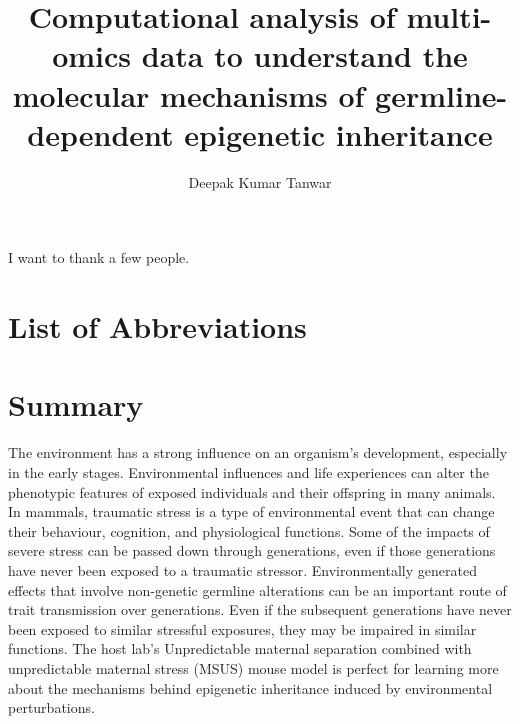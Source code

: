 \documentclass[12pt,twoside]{reedthesis}
\title{Computational analysis of multi-omics data to understand the molecular mechanisms of germline-dependent epigenetic inheritance}
\author{Deepak Kumar Tanwar}
\date{}
\begin{document}
  \maketitle

\frontmatter %
\pagestyle{empty} %
  \begin{acknowledgements}
    I want to thank a few people.
  \end{acknowledgements}

  \hypersetup{linkcolor=black}
  \setcounter{secnumdepth}{4}
  \setcounter{tocdepth}{4}
  \tableofcontents

  \listoftables

  \listoffigures



\mainmatter %
\pagestyle{fancyplain} %

\hypertarget{list-of-abbreviations}{%
\chapter*{List of Abbreviations}\label{list-of-abbreviations}}
\begin{acronym}[MPC]
\end{acronym}
\hypertarget{summary}{%
\chapter*{Summary}\label{summary}}

The environment has a strong influence on an organism's development, especially in the early stages. Environmental influences and life experiences can alter the phenotypic features of exposed individuals and their offspring in many animals. In mammals, traumatic stress is a type of environmental event that can change their behaviour, cognition, and physiological functions. Some of the impacts of severe stress can be passed down through generations, even if those generations have never been exposed to a traumatic stressor. Environmentally generated effects that involve non-genetic germline alterations can be an important route of trait transmission over generations. Even if the subsequent generations have never been exposed to similar stressful exposures, they may be impaired in similar functions. The host lab's Unpredictable maternal separation combined with unpredictable maternal stress (MSUS) mouse model is perfect for learning more about the mechanisms behind epigenetic inheritance induced by environmental perturbations.
\end{document}
